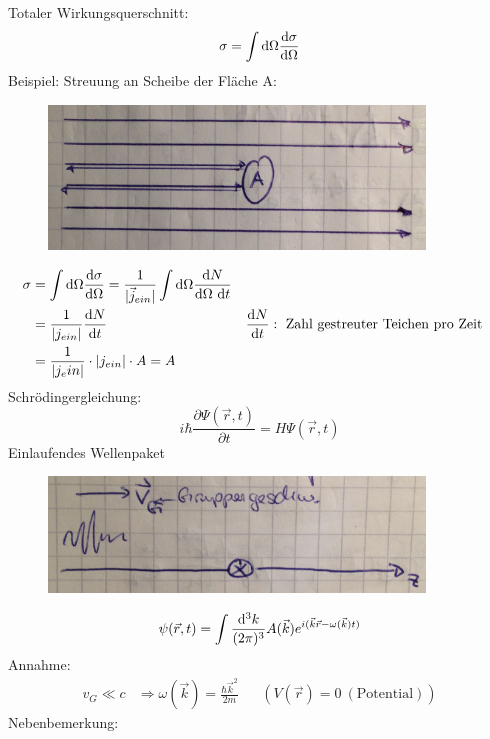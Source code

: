 	Totaler Wirkungsquerschnitt:
		\begin{align*}
			\sigma = \int \mathrm{d} \Omega \frac{\mathrm{d} \sigma}{\mathrm{d} \Omega}
		\end{align*}
	Beispiel: Streuung an Scheibe der Fläche A:
	\\
	\begin{figure} [h]
		\begin{center}
			\includegraphics[width=10cm]{Stat_Streuproblem_Wirkungsquerschnitt4}
		\end{center}
	\end{figure}
		\begin{align*}
			\sigma &= \int \mathrm{d} \Omega \frac{\mathrm{d} \sigma}{\mathrm{d} \Omega}
			= \frac{1}{|\vec{j}_{ein}|} \int \mathrm{d} \Omega \frac{\mathrm{d} N}{\mathrm{d} \Omega ~\mathrm{d} t}\\
			&= \frac{1}{|j_{ein}|} \frac{\mathrm{d} N}{\mathrm{d} t} & &\frac{\mathrm{d} N}{\mathrm{d} t}: 
			\text{~Zahl gestreuter Teichen pro Zeit} \\
			&= \frac{1}{|j_ein|} \cdot |j_{ein}| \cdot A = A
		\end{align*}
	Schrödingergleichung: 
		\begin{equation*}
			i \hbar \frac{\partial \Psi (\vec{r}, t)}{\partial t} = H \Psi (\vec{r} , t) 
		\end{equation*}
	Einlaufendes Wellenpaket
	
	\begin{figure} [h]
		\begin{center}
			\includegraphics[width=10cm]{Stat_Streuproblem_Wirkungsquerschnitt5}
		\end{center}
	\end{figure}
		\begin{equation*}
			\psi (\vec{r} , t) = 
			\int \frac{\mathrm{d}^3 k}{(2 \pi)^3} A(\vec{k}) e^{i(\vec{k} \vec{r} - \omega(\vec{k}) t)}
		\end{equation*}
	Annahme:
		\begin{align*}
			v_G \ll c &\Rightarrow \omega(\vec{k}) = \frac{\hbar \vec{k}^2}{2 m} & &(V(\vec{r}) = 0 ~(\text{Potential}))
		\end{align*}
	Nebenbemerkung:
	
